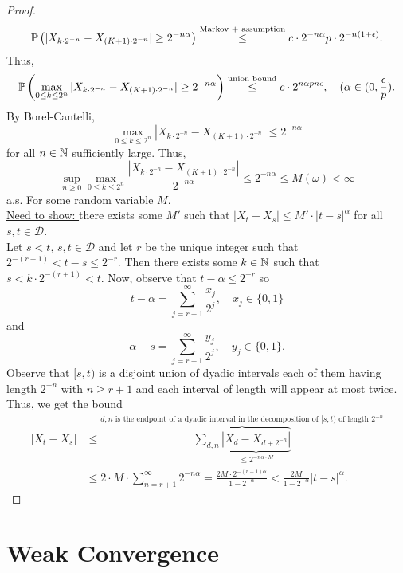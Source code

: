 \documentclass{article}
\begin{document}
\begin{proof}
\[
	\mathbb{P} \left( |X_{k\cdot 2^{-n}}-X_{(K+1)\cdot 2^{-n}}| \geq 2^{-n\alpha}\right)\stackrel{\text{Markov + assumption}}{\leq} c\cdot 2^{-n\alpha}p\cdot2^{-n(1+\epsilon)}. 
\]
Thus, 
\[
	\mathbb{P} \left( \max_{0\leq k \leq 2^n}|X_{k\cdot 2^{-n}}-X_{(K+1)\cdot 2^{-n}}| \geq 2^{-n\alpha} \right)\stackrel{\text{union bound}}{\leq} c\cdot 2^{n\alpha p n\epsilon}, \quad (\alpha \in (0, \frac{\epsilon}{p}).   
\]
By Borel-Cantelli, 
\[
\max_{0\leq k \leq 2^n}|X_{k\cdot 2^{-n}}-X_{(K+1)\cdot 2^{-n}}| \leq 2^{-n\alpha}
\]
for all $ n\in \mathbb{N}$ sufficiently large. Thus, 
\[
 \displaystyle\sup_{ n\geq 0}\max_{0\leq k \leq 2^n} \frac{ |X_{k\cdot 2^{-n}}-X_{(K+1)\cdot 2^{-n}}|}{2^{-n\alpha}} \leq 2^{-n\alpha}\leq M(\omega)<\infty
\]
a.s. For some random variable $ M$. \\ 

\underline{Need to show: } there exists some $ M'$ such that $ |X_{t}-X_{s}|\leq M'\cdot |t-s|^{\alpha}$ for all $ s,t \in \mathcal{D}$.\\ 

Let $ s<t$, $ s,t\in \mathcal{D}$ and let $ r$ be the unique integer such that $ 2^{-(r+1)}<t-s\leq 2^{-r}$. Then there exists some $ k\in \mathbb{N}$ such that $ s<k\cdot 2^{-(r+1)}<t$. Now, observe that $ t-\alpha\leq 2^{-r}$ so 
\[
	t-\alpha = \displaystyle\sum^{\infty}_{j=r+1} \frac{x_{j}}{2^j}, \quad x_{j}\in \{0,1\}
\]
and 
\[
	\alpha-s = \displaystyle\sum^{\infty}_{j=r+1} \frac{y_{j}}{2^j}, \quad y_{j}\in \{0,1\}.

\]
Observe that $ [s, t)$ is a disjoint union of dyadic intervals each of them having length $ 2^{-n}$ with $ n\geq r+1$ and each interval of length will appear at most twice. Thus, we get the bound
\[
\begin{array}{ll}
|X_{t}-X_{s}| &\leq\displaystyle\overbrace{\sum_{d,n}\displaystyle\underbrace{|X_d-X_{d+2^{-n}}|}_{\leq 2^{-n\alpha\cdot M}}}^{d,n \text{ is the endpoint of a dyadic interval in the decomposition of }[s,t) \text{ of length } 2^{-n}}  \\
	      &\leq 2\cdot M \cdot\displaystyle\sum^{\infty}_{n =  r+1} 2^{-n\alpha} = \frac{2M\cdot 2^{-(r+1)\alpha}}{1-2^{-\alpha}} < \frac{2M}{1-2^{-\alpha}}|t-s|^{\alpha}.
\end{array}
\]
\end{proof}

\section{Weak Convergence}\label{sec: weak convergence}
\end{document}
